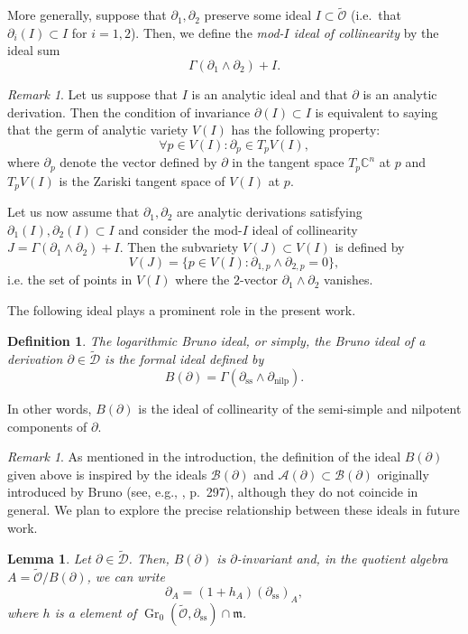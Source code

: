 \documentclass[10pt,twoside,reqno]{amsart}
\newtheorem{definition}[thm]{Definition}
\newtheorem{lemma}[thm]{Lemma}
\theoremstyle{remark}
\theoremstyle{remark}
\newtheorem{remark}[thm]{Remark}
\newcommand{\tmem}[1]{{\em #1\/}}
\newcommand{\tmop}[1]{{\operatorname{#1}}}
\newcommand{\tO}{\widetilde{\mathcal{O}}}
\newcommand{\cD}{\mathcal{D}}
\newcommand{\tcD}{\widetilde{\cD}}
\begin{document}
More generally, suppose that $\partial_1, \partial_2$ preserve some ideal $I \subset \tO$
  (i.e.~that $\partial_i(I)\subset I$ for $i=1,2$). Then, we define the
  {\tmem{mod-$I$ ideal of collinearity}} by the ideal sum
   \[ \Gamma (\partial_1 \wedge \partial_2) + I. \]
  \begin{remark}
  Let us suppose that $I$ is an analytic ideal and that $\partial$ is an analytic derivation. Then
  the condition of invariance $\partial (I) \subset I$ is equivalent to saying
  that the germ of analytic variety $V(I)$ has the following property:\ \
  \[ \forall p \in V (I) : \partial_p \in T_p V  (I), \]
  where $\partial_p$ denote the vector defined by $\partial$ in the tangent
  space $T_p \mathbb{C}^n$ at $p$ and $T_p V (I) $ is the Zariski tangent space of $V
  (I)$ at $p$.
  
  Let us now assume that $\partial_1, \partial_2$ are analytic derivations satisfying $\partial_1 (I), \partial_2 (I) \subset I$ and consider the mod-$I$ ideal of collinearity $J
  = \Gamma (\partial_1 \wedge \partial_2) + I$. Then the subvariety $V (J)
  \subset V (I)$ is defined by
  \[ V (J) = \{ p \in V (I) : \partial_{1, p} \wedge \partial_{2, p} = 0 \}, \]
 i.e. the set of points in $V(I)$ where the $2$-vector $\partial_1 \wedge \partial_2$ vanishes.
 \end{remark}
 The following ideal plays a prominent role in the present work.
    \begin{definition}
  The {\tmem{logarithmic Bruno ideal}}, or simply, the {\em Bruno ideal} of a derivation $\partial \in \tcD$
  is the formal ideal defined by
  \[ B (\partial) = \Gamma (\partial_{\tmop{ss}} \wedge
     \partial_{\tmop{nilp}}) .\]
\end{definition}
\noindent In other words, $B (\partial)$ is the ideal of collinearity of the semi-simple and
  nilpotent components of $\partial$.
\begin{remark}
As mentioned in the introduction, the definition of the ideal $B(\partial)$ given above is inspired by the ideals $\mathcal{B}(\partial)$ and $\mathcal{A}(\partial) \subset \mathcal{B}(\partial)$ originally introduced by Bruno (see, e.g., \cite{Bruno1989}, p.~297), although they do not coincide in general. We plan to explore the precise relationship between these ideals in future work.
\end{remark}
\begin{lemma}
  \label{lemma-(1+m)}Let $\partial \in \tcD$. Then, $B (\partial)$ is $\partial$-invariant and, in the
  quotient algebra $A = \tO / B (\partial)$, we can write
  \[ \partial_A = (1 + h_A) (\partial_{\tmop{ss}})_A, \]
  where $h$ is a element of $\tmop{Gr}_0 \left( \tO, \partial_{\tmop{ss}}
  \right) \cap \mathfrak{m}$.
\end{lemma}
\end{document}
